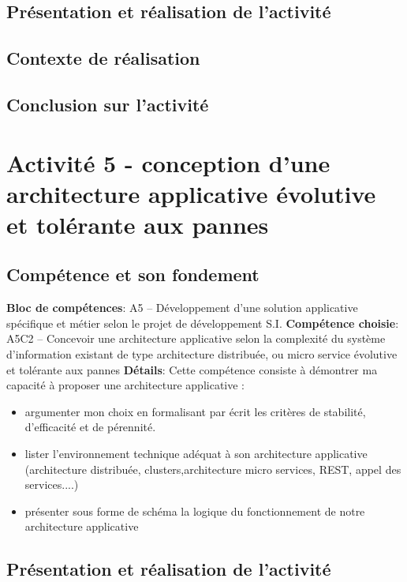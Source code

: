 \documentclass[a4paper, 11pt]{report}
\begin{document}
\subsection{Présentation et réalisation de l'activité}
\subsection{Contexte de réalisation}
\subsection{Conclusion sur l'activité}

\section{Activité 5 - conception d'une architecture applicative évolutive et tolérante aux pannes}
\subsection{Compétence et son fondement}
\textbf{Bloc de compétences}: A5 – Développement d’une solution applicative spécifique et métier selon le projet de développement S.I.
\newline
\textbf{Compétence choisie}: A5C2 – Concevoir une architecture applicative selon la complexité du système d’information existant de type architecture distribuée, ou micro service évolutive et tolérante aux pannes
\newline
\textbf{Détails}: Cette compétence consiste à démontrer ma capacité à proposer une architecture applicative :
\begin{itemize}
  \item argumenter mon choix en formalisant par écrit les critères de stabilité, d’efficacité et
de pérennité.
  \item lister l’environnement technique adéquat à son architecture applicative (architecture distribuée, clusters,architecture micro services, REST, appel des services....)
  \item présenter sous forme de schéma la logique du fonctionnement de notre architecture applicative
\end{itemize}
\subsection{Présentation et réalisation de l'activité}
\end{document}
